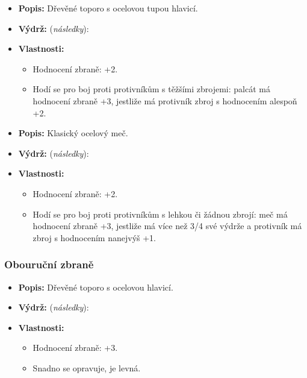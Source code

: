 \documentclass[../main.tex]{subfiles}
\begin{document}
\begin{predmet}[Palcát]
\begin{itemize}
	\item \textbf{Popis:} Dřevěné toporo s ocelovou tupou hlavicí.
	\item \textbf{Výdrž:} (\emph{následky}): 
	\item \textbf{Vlastnosti:} 
		\begin{itemize}
			\item Hodnocení zbraně: +2. 
			\item Hodí se pro boj proti protivníkům s těžšími zbrojemi: palcát má hodnocení zbraně +3, jestliže má protivník zbroj s hodnocením alespoň +2.
		\end{itemize}
\end{itemize}
\end{predmet}

\begin{predmet}[Meč]
\begin{itemize}
		\item \textbf{Popis:} Klasický ocelový meč. \sidenotemark
		\item \textbf{Výdrž:} (\emph{následky}): 
		\item \textbf{Vlastnosti:}
			\begin{itemize}
				\item Hodnocení zbraně: +2. 
				\item Hodí se pro boj proti protivníkům s lehkou či žádnou zbrojí: meč má hodnocení zbraně +3, jestliže má více než 3/4 své výdrže a protivník má zbroj s hodnocením nanejvýš +1. \sidenotemark 
			\end{itemize}
	\end{itemize}
	\end{predmet}
	\subsubsection{Obouruční zbraně}
	\label{sec:zbrane_treti}

	\begin{predmet}
	\begin{itemize}
		\item \textbf{Popis:} Dřevěné toporo s ocelovou hlavicí.
		\item \textbf{Výdrž:} (\emph{následky}): 
		\item \textbf{Vlastnosti:} 
			\begin{itemize}
				\item Hodnocení zbraně: +3.
				\item Snadno se opravuje, je levná. 
			\end{itemize}
	\end{itemize}
	\end{predmet}
\end{document}
